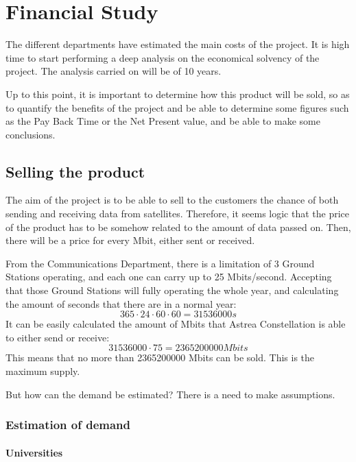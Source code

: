 \chapter{Financial Study}

The different departments have estimated the main costs of the project. It is high time to start performing a deep analysis on the economical solvency of the project. The analysis carried on will be of 10 years. 

Up to this point, it is important to determine how this product will be sold, so as to quantify the benefits of the project and be able to determine some figures such as the Pay Back Time or the Net Present value, and be able to make some conclusions. 

\section{Selling the product}

The aim of the project is to be able to sell to the customers the chance of both sending and receiving data from satellites. Therefore, it seems logic that the price of the product has to be somehow related to the amount of data passed on. Then, there will be a price for every Mbit, either sent or received. 

From the Communications Department, there is a limitation of 3 Ground Stations operating, and each one can carry up to 25 Mbits/second. Accepting that those Ground Stations will fully operating the whole year, and calculating the amount of seconds that there are in a normal year:
\begin{equation}
365 \cdot 24 \cdot 60 \cdot 60 = 31536000 s
\end{equation}
It can be easily calculated the amount of Mbits that Astrea Constellation is able to either send or receive:
\begin{equation}
31536000 \cdot 75 = 2365200000 Mbits
\end{equation}
This means that no more than 2365200000 Mbits can be sold. This is the maximum supply.

But how can the demand be estimated? There is a need to make assumptions. 

\subsection{Estimation of demand}

\subsubsection{Universities}

